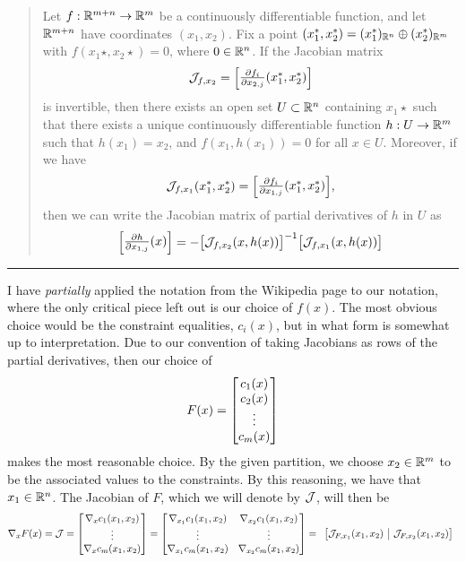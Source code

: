 \begin{solution}
\begin{quote}
        Let $f: \mathbb{R}^{m+n} \rightarrow \mathbb{R}^m$ be a continuously differentiable function, and let $\mathbb{R}^{m + n}$ have coordinates $(x_1, x_2)$. Fix a point $(x_1^{*}, x_2^{*}) = (x_1^{*})_{\mathbb{R}^n} \oplus (x_2^{*})_{\mathbb{R}^m}$ with $f(x_1\star, x_2\star) = 0$, where $0 \in \mathbb{R}^n$. If the Jacobian matrix
        \[\scJ_{f, x_2} = \mqty[\frac{\partial f_i}{\partial x_{2, j}}(x_1\star, x_2\star)]\]
        is invertible, then there exists an open set $U \subset \mathbb{R}^n$ containing $x_1\star$ such that there exists a unique continuously differentiable function $h: U\rightarrow \mathbb{R}^m$ such that $h(x_1) = x_2$, and $f(x_1, h(x_1)) = 0$ for all $x \in U$. Moreover, if we have 
        \[\scJ_{f, x_1}(x_1\star, x_2\star) = \mqty[\frac{\partial f_i}{\partial x_{1, j}}(x_1\star, x_2\star)],\]
        then we can write the Jacobian matrix of partial derivatives of $h$ in $U$ as 
        \[\mqty[\frac{\partial h}{\partial x_{1, j}}(x)] = -\mqty[\scJ_{f, x_2}(x, h(x))]\inv \mqty[\scJ_{f, x_1}(x, h(x))]\]
    \vspace{-15mm}
    \end{quote}
    \begin{center}\rule{17cm}{0.1mm}\end{center}
    I have \textit{partially} applied the notation from the Wikipedia page to our notation, where the only critical piece left out is our choice of $f(x)$. The most obvious choice would be the constraint equalities, $c_i(x)$, but in what form is somewhat up to interpretation. Due to our convention of taking Jacobians as rows of the partial derivatives, then our choice of 
    \[F(x) = \mqty[c_1(x)\\c_2(x)\\\vdots\\c_m(x)]\]
    makes the most reasonable choice. By the given partition, we choose $x_2 \in \mathbb{R}^m$ to be the associated values to the constraints. By this reasoning, we have that $x_1 \in \mathbb{R}^n$. The Jacobian of $F$, which we will denote by $\mathcal{J}$, will then be 
    \[\grad_x F (x) = \scJ = \mqty[\grad_x c_1(x_1, x_2)\\\vdots\\ \grad_x c_m(x_1, x_2)] = \mqty[\grad_{x_1} c_1(x_1, x_2) & \grad_{x_2} c_1(x_1, x_2)\\\vdots&\vdots\\ \grad_{x_1} c_m(x_1, x_2) & \grad_{x_2} c_m(x_1, x_2)] = \begin{array}{c|c}
        \big[\scJ_{F, x_1}(x_1, x_2) & \scJ_{F, x_2}(x_1, x_2)\big]
    \end{array}\]

\end{solution}
